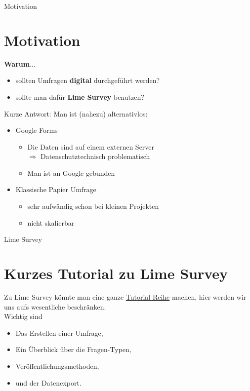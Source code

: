 \documentclass[aspectratio=1610, 9pt]{beamer}
\begin{document}
\begin{frame}{Motivation}
	\section{Motivation}
	\label{sec:Motivation}
	
	\textbf{Warum}...
	\begin{itemize}
		\item sollten Umfragen \textbf{digital} durchgeführt werden?
		\item sollte man dafür \textbf{Lime Survey} benutzen?
	\end{itemize}
	\medskip
	Kurze Antwort: Man ist (nahezu) alternativlos:
	\begin{itemize}
		\item Google Forms
			\begin{itemize}
				\item Die Daten sind auf einem externen Server
					\\
					$\Rightarrow$ Datenschutztechnisch problematisch
				\item Man ist an Google gebunden
			\end{itemize}
		\item Klassische Papier Umfrage
			\begin{itemize}
				\item sehr aufwändig schon bei kleinen Projekten
				\item nicht skalierbar
			\end{itemize}
	\end{itemize}
\end{frame}

\begin{frame}{Lime Survey}
	\section{Kurzes Tutorial zu Lime Survey}
	\label{sec:Kurzes Tutorial zu Lime Survey}
	Zu Lime Survey könnte man eine ganze
	\href{https://www.youtube.com/playlist?list=PLW94YiC0vWnWkb5_iDClcmgnzNXObVan6}{Tutorial Reihe} 
	machen, hier werden wir uns aufs wesentliche beschränken.
	\\
	Wichtig sind
	\begin{itemize}
		\item Das Erstellen einer Umfrage,
		\item Ein Überblick über die Fragen-Typen,
		\item Veröffentlichungsmethoden,
		\item und der Datenexport.
	\end{itemize}
\end{frame}
\end{document}
